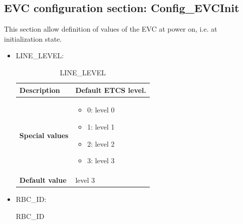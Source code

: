 \subsection{EVC configuration section: Config\_EVCInit}
This section allow definition of values of the EVC at power on, i.e. at initialization state.
	\begin{itemize}
		\item LINE\_LEVEL:

			\begin{longtable}{|l|l|}
				\caption{LINE\_LEVEL}\\
				\hline

					\begin{minipage}[t]{0.22\linewidth} \textbf{Description}	\end{minipage}
				&	\begin{minipage}[t]{0.78\linewidth} Default ETCS level. \end{minipage} \\

				\hline

					\begin{minipage}[t]{0.22\linewidth} \textbf{Special values}	\end{minipage}
				&	\begin{minipage}[t]{0.78\linewidth} \begin{itemize} \item 0: level 0 \item 1: level 1 \item 2: level 2 \item 3: level 3 \end{itemize} \end{minipage} \\

				\hline

					\begin{minipage}[t]{0.22\linewidth} \textbf{Default value}	\end{minipage}
				&	\begin{minipage}[t]{0.78\linewidth} level 3 \end{minipage} \\

				\hline

			\end{longtable}

		\item RBC\_ID:

			\begin{longtable}{|l|l|}
				\caption{RBC\_ID}\\
				\hline


\end{longtable}
\end{itemize}
